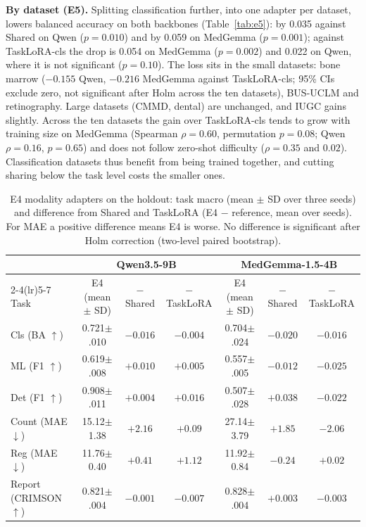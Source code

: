 \documentclass[journal,twoside,web]{ieeecolor}
\begin{document}
\textbf{By dataset (E5).} Splitting classification further, into one adapter
per dataset, lowers balanced accuracy on both backbones
(Table~\ref{tab:e5}): by 0.035 against Shared on Qwen ($p=0.010$) and by
0.059 on MedGemma ($p=0.001$); against TaskLoRA-cls the drop is 0.054 on
MedGemma ($p=0.002$) and 0.022 on Qwen, where it is not significant
($p=0.10$). The loss sits in the small datasets: bone marrow ($-0.155$ Qwen,
$-0.216$ MedGemma against TaskLoRA-cls; 95\% CIs exclude zero, not significant
after Holm across the ten datasets), BUS-UCLM and retinography. Large
datasets (CMMD, dental) are unchanged, and IUGC gains slightly. Across the
ten datasets the gain over TaskLoRA-cls tends to grow with training size on
MedGemma (Spearman $\rho=0.60$, permutation $p=0.08$; Qwen $\rho=0.16$,
$p=0.65$) and does not follow zero-shot difficulty ($\rho=0.35$ and $0.02$).
Classification datasets thus benefit from being trained together, and
cutting sharing below the task level costs the smaller ones.

\begin{table}[!t]
\caption{E4 modality adapters on the holdout: task macro (mean $\pm$ SD over
three seeds) and difference from Shared and TaskLoRA (E4 $-$ reference, mean
over seeds). For MAE a positive difference means E4 is worse. No difference
is significant after Holm correction (two-level paired bootstrap).}
\label{tab:e4}
\centering
\setlength{\tabcolsep}{6pt}
\renewcommand{\arraystretch}{1.15}
\begin{tabular}{lcccccc}
\toprule
& \multicolumn{3}{c}{Qwen3.5-9B} & \multicolumn{3}{c}{MedGemma-1.5-4B} \\
\cmidrule(lr){2-4}\cmidrule(lr){5-7}
Task & E4 (mean $\pm$ SD) & $-$Shared & $-$TaskLoRA & E4 (mean $\pm$ SD) & $-$Shared & $-$TaskLoRA \\
\midrule
Cls (BA $\uparrow$) & 0.721{\scriptsize$\pm$.010} & $-0.016$ & $-0.004$ & 0.704{\scriptsize$\pm$.024} & $-0.020$ & $-0.016$ \\
ML (F1 $\uparrow$) & 0.619{\scriptsize$\pm$.008} & $+0.010$ & $+0.005$ & 0.557{\scriptsize$\pm$.005} & $-0.012$ & $-0.025$ \\
Det (F1 $\uparrow$) & 0.908{\scriptsize$\pm$.011} & $+0.004$ & $+0.016$ & 0.507{\scriptsize$\pm$.028} & $+0.038$ & $-0.022$ \\
Count (MAE $\downarrow$) & 15.12{\scriptsize$\pm$1.38} & $+2.16$ & $+0.09$ & 27.14{\scriptsize$\pm$3.79} & $+1.85$ & $-2.06$ \\
Reg (MAE $\downarrow$) & 11.76{\scriptsize$\pm$0.40} & $+0.41$ & $+1.12$ & 11.92{\scriptsize$\pm$0.84} & $-0.24$ & $+0.02$ \\
Report (CRIMSON $\uparrow$) & 0.821{\scriptsize$\pm$.004} & $-0.001$ & $-0.007$ & 0.828{\scriptsize$\pm$.004} & $+0.003$ & $-0.003$ \\
\bottomrule
\end{tabular}
\end{table}
\end{document}
